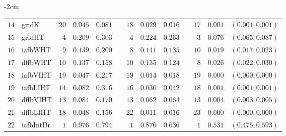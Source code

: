 \begin{table*}[!htbp]
\begin{adjustwidth*}{}{-2cm}
\begin{tabular}{@{}rlrrrrrrrrrcc@{}}
\footnotesize{$14$} & \footnotesize{gridK    } & \footnotesize{$20$} & \footnotesize{$0.045$} & \footnotesize{$0.081$} && \footnotesize{$18$} & \footnotesize{$0.029$} & \footnotesize{$0.016$} && \footnotesize{$17$} & \footnotesize{$0.001$} & \footnotesize{$(0.001;0.001)$} \\
\footnotesize{$15$} & \footnotesize{gridHT   } & \footnotesize{$4 $} & \footnotesize{$0.209$} & \footnotesize{$0.303$} && \footnotesize{$4 $} & \footnotesize{$0.224$} & \footnotesize{$0.263$} && \footnotesize{$3 $} & \footnotesize{$0.076$} & \footnotesize{$(0.065;0.087)$} \\
\footnotesize{$16$} & \footnotesize{iafbWHT  } & \footnotesize{$9 $} & \footnotesize{$0.139$} & \footnotesize{$0.200$} && \footnotesize{$8 $} & \footnotesize{$0.141$} & \footnotesize{$0.135$} && \footnotesize{$10$} & \footnotesize{$0.019$} & \footnotesize{$(0.017;0.023)$} \\
\footnotesize{$17$} & \footnotesize{dffbWHT  } & \footnotesize{$10$} & \footnotesize{$0.137$} & \footnotesize{$0.158$} && \footnotesize{$10$} & \footnotesize{$0.135$} & \footnotesize{$0.124$} && \footnotesize{$8 $} & \footnotesize{$0.026$} & \footnotesize{$(0.022;0.030)$} \\
\footnotesize{$18$} & \footnotesize{iafbVIHT } & \footnotesize{$19$} & \footnotesize{$0.047$} & \footnotesize{$0.217$} && \footnotesize{$19$} & \footnotesize{$0.014$} & \footnotesize{$0.018$} && \footnotesize{$19$} & \footnotesize{$0.000$} & \footnotesize{$(0.000;0.000)$} \\
\footnotesize{$19$} & \footnotesize{iafbLIHT } & \footnotesize{$14$} & \footnotesize{$0.082$} & \footnotesize{$0.316$} && \footnotesize{$16$} & \footnotesize{$0.030$} & \footnotesize{$0.042$} && \footnotesize{$18$} & \footnotesize{$0.001$} & \footnotesize{$(0.001;0.001)$} \\
\footnotesize{$20$} & \footnotesize{dffbVIHT } & \footnotesize{$13$} & \footnotesize{$0.084$} & \footnotesize{$0.170$} && \footnotesize{$13$} & \footnotesize{$0.062$} & \footnotesize{$0.064$} && \footnotesize{$13$} & \footnotesize{$0.004$} & \footnotesize{$(0.003;0.005)$} \\
\footnotesize{$21$} & \footnotesize{dffbLIHT } & \footnotesize{$18$} & \footnotesize{$0.048$} & \footnotesize{$0.156$} && \footnotesize{$22$} & \footnotesize{$0.011$} & \footnotesize{$0.016$} && \footnotesize{$23$} & \footnotesize{$0.000$} & \footnotesize{$(0.000;0.000)$} \\
\footnotesize{$22$} & \footnotesize{iafbIntDr} & \footnotesize{$1 $} & \footnotesize{$0.976$} & \footnotesize{$0.794$} && \footnotesize{$1 $} & \footnotesize{$0.876$} & \footnotesize{$0.636$} && \footnotesize{$1 $} & \footnotesize{$0.531$} & \footnotesize{$(0.475;0.593)$} \\

\end{tabular}
\end{adjustwidth*}
\end{table*}
